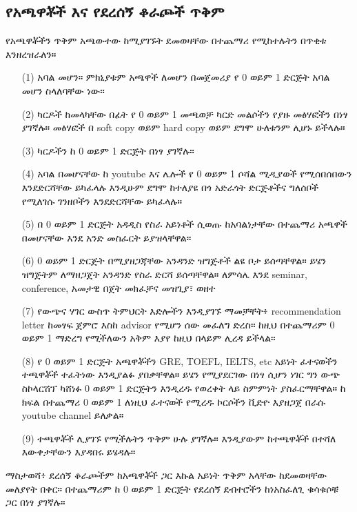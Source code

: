 \documentclass[a4paper,12pt]{article}
\newenvironment{geez}{\geezfont}{}
\begin{document}
\subsection{\begin{geez}የአጫዋቾች እና የደረሰኝ ቆራጮች ጥቅም\end{geez}}
\justify
የአጫዋቾችን ጥቅም አጫውተው ከሚያገኙት ደመወዛቸው በተጨማሪ የሚከተሉትን በጥቂቱ እንዘረዝራለን።
\begin{enumerate}
\item[(1)] አባል መሆን። ምክኒያቱም አጫዋች ለመሆን በመጀመሪያ የ 0 ወይም 1 ድርጅት አባል መሆን ስላለባቸው ነው።
\item[(2)] ካርዶች ከመላካቸው በፊት የ 0 ወይም 1 መጫወቻ ካርድ መልሶችን የያዙ መፅሃፎችን በነፃ ያገኛሉ። መፅሃፎች በ soft copy ወይም hard copy ወይም ደግሞ ሁለቱንም ሊሆኑ ይችላሉ። 
\item[(3)] ካርዶችን ከ 0 ወይም 1 ድርጅት በነፃ ያገኛሉ።
\item[(4)] አባል በመሆናቸው ከ youtube እና ሌሎች የ 0 ወይም 1 ሶሻል ሚዲያወች የሚሰበሰበውን እንደድርሻቸው ይካፈላሉ እንዲሁም ደግሞ ከተለያዩ በጎ አድራጎት ድርጅቶችና ግለሰቦች የሚለገሱ ገንዘቦችን እንደድርሻቸው ይካፈላሉ።
\item[(5)] በ 0 ወይም 1 ድርጅት አዳዲስ የስራ አይነቶች ሲወጡ ከአባልነታቸው በተጨማሪ አጫዋች በመሆናቸው እንደ አንድ መስፈርት ይያዝላቸዋል።
\item[(6)] 0 ወይም 1 ድርጅት በሚያዘጋጃቸው አንዳንድ ዝግጅቶች ልዩ ቦታ ይሰጣቸዋል። ይሄን ዝግጅትም ለማዘጋጀት አንዳንድ የስራ ድርሻ ይሰጣቸዋል። ለምሳሌ እንደ seminar, conference, አመታዊ በጀት መክፈቻና መዝጊያ፣ ወዘተ
\item[(7)] የውጭና ሃገር ውስጥ ትምህርት እድሎችን እንዲያገኙ ማመቻቸት፥ recommendation letter ከመፃፍ ጀምሮ እስከ advisor የሚሆን ሰው መፈለግ ድረስ። ከዚህ በተጨማሪም 0 ወይም 1 ማድረግ የሚችለውን አቅም እያየ ከዚህ በላይም ሊረዳ ይችላል።
\item[(8)] የ 0 ወይም 1 ድርጅት አጫዋቾችን GRE, TOEFL, IELTS, etc አይነት ፈተናወችን ተጫዋቾች ተፈትነው እንዲያልፉ ያበቃቸዋል። ይሄን የሚያደርገው በነፃ ሲሆን ነገር ግን ውጭ ስኮላርሽፕ ካሸነፉ 0 ወይም 1 ድርጅትን እንዲረዱ የወረቀት ላይ ስምምነት ያስፈርማቸዋል። ከ ክፍል በተጨማሪ 0 ወይም 1 ለነዚህ ፈተናወች የሚረዱ ኮርሶችን ቪድዮ እያዘጋጀ በራሱ youtube channel ይለቃል። 
\item[(9)] ተጫዋቾች ሊያገኙ የሚችሉትን ጥቅም ሁሉ ያገኛሉ። እንዲያውም ከተጫዋቾች በተሻለ እውቀታቸውን እያዳበሩ ይሄዳሉ።
\end{enumerate}
{\color{red}ማስታወሻ}፥ ደረሰኝ ቆራጮችም ከአጫዋቾች ጋር እኩል አይነት ጥቅም አላቸው ከደመወዛቸው መለያየት በቀር። በተጨማሪም ከ 0 ወይም 1 ድርጅት የደረሰኝ ደብተሮችን ከነአስፈለጊ ቁሳቁሶቹ ጋር በነፃ ያገኛሉ።
\end{document}

